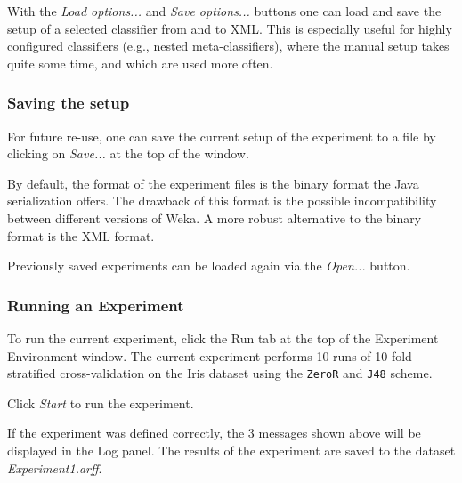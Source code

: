 \documentclass[a4paper]{article}
\begin{document}
With the \textit{Load options...} and \textit{Save options...} buttons one can load and save the setup of a selected classifier from and to XML. This is especially useful for highly configured classifiers (e.g., nested meta-classifiers), where the manual setup takes quite some time, and which are used more often.


\subsubsection{Saving the setup}

For future re-use, one can save the current setup of the experiment to a file by clicking on \textit{Save...} at the top of the window.

\begin{center}
\end{center}


By default, the format of the experiment files is the binary format the Java serialization offers. The drawback of this format is the possible incompatibility between different versions of Weka. A more robust alternative to the binary format is the XML format.

Previously saved experiments can be loaded again via the \textit{Open...} button.


\subsubsection{Running an Experiment}

To run the current experiment, click the Run tab at the top of the Experiment Environment window. The current experiment performs 10 runs of 10-fold stratified cross-validation on the Iris dataset using the \texttt{ZeroR} and \texttt{J48} scheme.

\begin{center}
\end{center}


Click \textit{Start} to run the experiment.

\begin{center}
\end{center}


If the experiment was defined correctly, the 3 messages shown above will be displayed in the Log panel. The results of the experiment are saved to the dataset \textit{Experiment1.arff}. 
\end{document}
